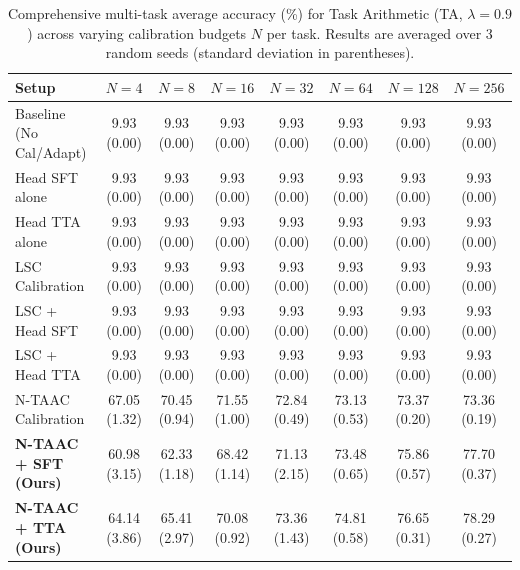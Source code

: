 \begin{table}[ht]
\centering
\caption{Comprehensive multi-task average accuracy (\%) for Task Arithmetic (TA, $\lambda=0.9$) across varying calibration budgets $N$ per task. Results are averaged over 3 random seeds (standard deviation in parentheses).}
\label{tab:appendix_ta_09}
\vskip 0.15in
\begin{sc}
\begin{scriptsize}
\setlength{\tabcolsep}{3pt}
\begin{tabular}{lccccccc}
\toprule
Setup & $N=4$ & $N=8$ & $N=16$ & $N=32$ & $N=64$ & $N=128$ & $N=256$ \\
\midrule
Baseline (No Cal/Adapt) & 9.93 (0.00) & 9.93 (0.00) & 9.93 (0.00) & 9.93 (0.00) & 9.93 (0.00) & 9.93 (0.00) & 9.93 (0.00) \\
Head SFT alone & 9.93 (0.00) & 9.93 (0.00) & 9.93 (0.00) & 9.93 (0.00) & 9.93 (0.00) & 9.93 (0.00) & 9.93 (0.00) \\
Head TTA alone & 9.93 (0.00) & 9.93 (0.00) & 9.93 (0.00) & 9.93 (0.00) & 9.93 (0.00) & 9.93 (0.00) & 9.93 (0.00) \\
LSC Calibration & 9.93 (0.00) & 9.93 (0.00) & 9.93 (0.00) & 9.93 (0.00) & 9.93 (0.00) & 9.93 (0.00) & 9.93 (0.00) \\
LSC + Head SFT & 9.93 (0.00) & 9.93 (0.00) & 9.93 (0.00) & 9.93 (0.00) & 9.93 (0.00) & 9.93 (0.00) & 9.93 (0.00) \\
LSC + Head TTA & 9.93 (0.00) & 9.93 (0.00) & 9.93 (0.00) & 9.93 (0.00) & 9.93 (0.00) & 9.93 (0.00) & 9.93 (0.00) \\
N-TAAC Calibration & 67.05 (1.32) & 70.45 (0.94) & 71.55 (1.00) & 72.84 (0.49) & 73.13 (0.53) & 73.37 (0.20) & 73.36 (0.19) \\
\textbf{N-TAAC + SFT (Ours)} & 60.98 (3.15) & 62.33 (1.18) & 68.42 (1.14) & 71.13 (2.15) & 73.48 (0.65) & 75.86 (0.57) & 77.70 (0.37) \\
\textbf{N-TAAC + TTA (Ours)} & 64.14 (3.86) & 65.41 (2.97) & 70.08 (0.92) & 73.36 (1.43) & 74.81 (0.58) & 76.65 (0.31) & 78.29 (0.27) \\
\bottomrule
\end{tabular}
\end{scriptsize}
\end{sc}
\end{table}

